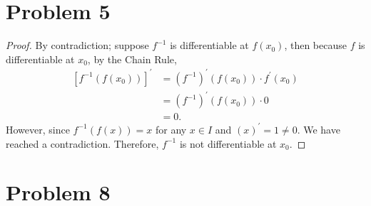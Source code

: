 \documentclass[12pt]{article}
\begin{document}
\section*{Problem 5}

\begin{proof}
  By contradiction; suppose $f^{-1}$ is differentiable at $f(x_0)$, then because $f$ is differentiable at $x_0$, by the Chain Rule,
  \begin{align*}
    \left[ f^{-1}(f(x_0)) \right]^\prime &= \left( f^{-1} \right)^\prime \left(f(x_0)\right) \cdot f^\prime(x_0)\\
                                         &= \left( f^{-1} \right)^\prime \left(f(x_0)\right) \cdot 0\\ &= 0.
  \end{align*}
  However, since $f^{-1} \left( f(x) \right) =x$ for any $x \in I$ and $(x)^\prime = 1 \not=0$. We have reached a contradiction. Therefore, $f^{-1}$ is not differentiable at $x_0$.
\end{proof}

\section*{Problem 8}
\end{document}
